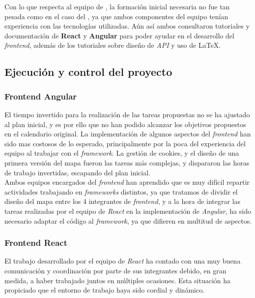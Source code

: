 \documentclass[11pt, a4paper, titlepage]{article}
\begin{document}
Con lo que respecta al equipo de , la formación inicial necesaria no fue tan pesada como en el caso del , ya que ambos componentes del equipo tenían experiencia con las tecnologías utilizadas. Aún así ambos consultaron tutoriales y documentación de \textbf{React} y \textbf{Angular} para poder ayudar en el desarrollo del \textit{frontend}, además de los tutoriales sobre diseño de \textit{API} y uso de \LaTeX.

\subsection{Ejecución y control del proyecto}
\subsubsection{Frontend Angular}

El tiempo invertido para la realización de las tareas propuestas no se ha ajustado al plan inicial, y es por ello que no han podido alcanzar los objetivos propuestos en el calendario original. La implementación de algunos aspectos del \textit{frontend} han sido mas costosos de lo esperado, principalmente por la poca del experiencia del equipo al trabajar con el \textit{framework}. La gestión de cookies, y el diseño de una primera versión del mapa fueron las tareas más complejas, y dispararon las horas de trabajo invertidas, escapando del plan inicial.\\

Ambos equipos encargados del \textit{frontend} han aprendido que es muy difícil repartir actividades trabajando en \textit{frameworks} distintos, ya que tratamos de dividir el diseño del mapa entre los 4 integrantes de \textit{frontend}, y a la hora de integrar las tareas realizadas por el equipo de \textit{React} en la implementación de \textit{Angular}, ha sido necesario adaptar el código al \textit{framework}, ya que difieren en multitud de aspectos.

\subsubsection{Frontend React}


El trabajo desarrollado por el equipo de \textit{React} ha contado con una muy buena comunicación y coordinación por parte de sus integrantes debido, en gran medida, a haber trabajado juntos en múltiples ocasiones. Esta situación ha propiciado que el entorno de trabajo haya sido cordial y dinámico. \\
\end{document}
